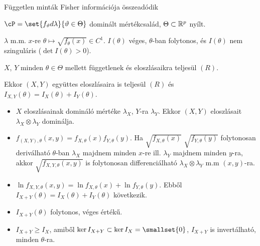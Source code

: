 \documentclass[aspectratio=169,notheorems,9pt,\option]{beamer}
\begin{document}
\begin{frame}{Független minták Fisher információja összeadódik}
    \begin{df}
      $\cP=\set{f_\theta d\lambda}{\theta\in\Theta}$ dominált mértékcsalád, $\Theta\subset\mathbb{R}^p$ nyílt.

      $\lambda$ m.m. $x$-re $\theta\mapsto \sqrt{f_\theta(x)}\in C^1$. %
    $I(\theta)$ véges, $\theta$-ban folytonos, és $I(\theta)$ nem szinguláris ($\det I(\theta)>0$).
    \end{df}
    \begin{proposition}
      $X$, $Y$ minden $\theta\in\Theta$ mellett függetlenek és eloszlásaikra teljesül $(R)$.
  
      Ekkor $(X,Y)$ együttes eloszlásaira is teljesül $(R)$ és $I_{X,Y}(\theta)=I_{X}(\theta)+I_{Y}(\theta)$.
    \end{proposition}
    \begin{itemize}
      \item $X$ eloszlásainak domináló mértéke $\lambda_X$, $Y$-ra $\lambda_Y$. Ekkor $(X,Y)$ eloszlásait 
      $\lambda_X\otimes\lambda_Y$ dominálja. 
      \item $f_{(X,Y),\theta}(x,y)=f_{X,\theta}(x)f_{Y,\theta}(y)$. Ha $\sqrt{f_{X,\theta}(x)}$ $\sqrt{f_{Y,\theta}(y)}$ 
      folytonosan deriválható $\theta$-ban $\lambda_X$ majdnem minden $x$-re ill. $\lambda_Y$ majdnem minden $y$-ra, akkor 
      $\sqrt{f_{X,Y,\theta}(x,y)}$ is folytonosan differenciálható $\lambda_X\otimes\lambda_Y$ m.m $(x,y)$-ra. 
      \item $\ln f_{X,Y,\theta}(x,y)=\ln f_{X,\theta}(x)+\ln f_{Y,\theta}(y)$. 
      Ebből $I_{X+Y}(\theta)=I_X(\theta)+I_{Y}(\theta)$ következik. 
      \item $I_{X+Y}(\theta)$ folytonos, véges értékű.
      \item $I_{X+Y}\geq I_{X}$, amiből $\ker I_{X+Y}\subset \ker I_X=\smallset{0}$, 
      $I_{X+Y}$ is invertálható, minden $\theta$-ra.
    \end{itemize}
  \end{frame}
  
\end{document}
